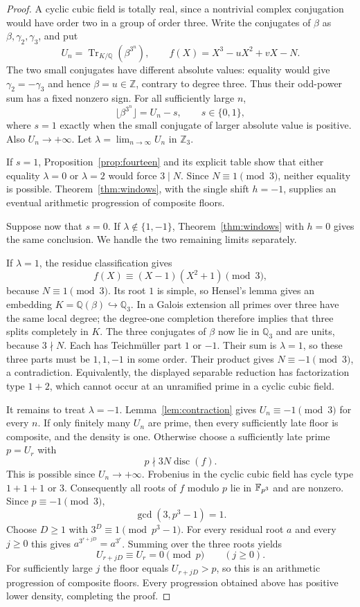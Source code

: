 \documentclass[11pt,a4paper]{article}
\theoremstyle{remark}\newtheorem{remark}[theorem]{Remark}
\newcommand{\Z}{\mathbb Z}\newcommand{\Q}{\mathbb Q}
\newcommand{\Tr}{\operatorname{Tr}}\newcommand{\Nm}{\operatorname{N}}
\begin{document}
\begin{proof}
A cyclic cubic field is totally real, since a nontrivial complex
conjugation would have order two in a group of order three. Write
the conjugates of $\beta$ as $\beta,\gamma_2,\gamma_3$, and put
\[
 U_n=\Tr_{K/\Q}(\beta^{3^n}),\qquad
 f(X)=X^3-uX^2+vX-N.
\]
The two small conjugates have different absolute values: equality
would give $\gamma_2=-\gamma_3$ and hence $\beta=u\in\Z$,
contrary to degree three. Thus their odd-power sum has a fixed
nonzero sign. For all sufficiently large $n$,
\[
 \lfloor\beta^{3^n}\rfloor=U_n-s,
 \qquad s\in\{0,1\},
\]
where $s=1$ exactly when the small conjugate of larger absolute
value is positive. Also $U_n\to+\infty$.
Let $\lambda=\lim_{n\to\infty}U_n$ in $\Z_3$.

If $s=1$, Proposition~\ref{prop:fourteen} and its explicit table
show that either equality $\lambda=0$ or $\lambda=2$ would force
$3\mid N$. Since $N\equiv1\pmod3$, neither equality is possible.
Theorem~\ref{thm:windows}, with the single shift $h=-1$, supplies
an eventual arithmetic progression of composite floors.

Suppose now that $s=0$. If $\lambda\notin\{1,-1\}$,
Theorem~\ref{thm:windows} with $h=0$ gives the same conclusion.
We handle the two remaining limits separately.

If $\lambda=1$, the residue classification gives
\[
 f(X)\equiv(X-1)(X^2+1)\pmod3,
\]
because $N\equiv1\pmod3$. Its root $1$ is simple, so Hensel's
lemma gives an embedding $K=\Q(\beta)\hookrightarrow\Q_3$.
In a Galois extension all primes over three have the same local
degree; the degree-one completion therefore implies that three
splits completely in $K$. The three conjugates of $\beta$ now lie
in $\Q_3$ and are units, because $3\nmid N$. Each has
Teichm\"uller part $1$ or $-1$. Their sum is $\lambda=1$, so
these three parts must be $1,1,-1$ in some order. Their product
gives $N\equiv-1\pmod3$, a contradiction. Equivalently, the
displayed separable reduction has factorization type $1+2$,
which cannot occur at an unramified prime in a cyclic cubic field.

It remains to treat $\lambda=-1$. Lemma~\ref{lem:contraction}
gives $U_n\equiv-1\pmod3$ for every $n$. If only finitely many
$U_n$ are prime, then every sufficiently late floor is composite,
and the density is one. Otherwise choose a sufficiently late
prime $p=U_r$ with
\[
 p\nmid3N\operatorname{disc}(f).
\]
This is possible since $U_n\to+\infty$. Frobenius in the cyclic
cubic field has cycle type $1+1+1$ or $3$. Consequently all roots
of $f$ modulo $p$ lie in $\mathbb F_{p^3}$ and are nonzero. Since
$p\equiv-1\pmod3$,
\[
 \gcd(3,p^3-1)=1.
\]
Choose $D\ge1$ with $3^D\equiv1\pmod{p^3-1}$. For every
residual root $a$ and every $j\ge0$ this gives
$a^{3^{r+jD}}=a^{3^r}$. Summing over the three roots yields
\[
 U_{r+jD}\equiv U_r=0\pmod p\qquad(j\ge0).
\]
For sufficiently large $j$ the floor equals $U_{r+jD}>p$, so
this is an arithmetic progression of composite floors. Every
progression obtained above has positive lower density, completing
the proof.
\end{proof}
\end{document}
